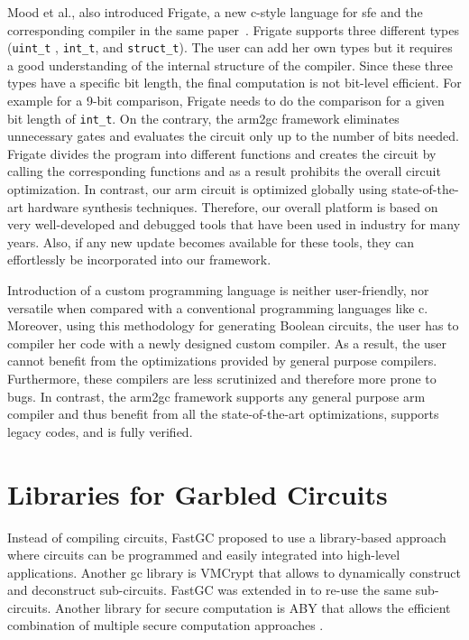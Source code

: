Mood et al., also introduced Frigate, a new \gls{c}-style language for \acrshort{sfe} and the corresponding compiler in the same paper~\cite{mood2016frigate}.
Frigate supports three different types (\texttt{uint\_t} , \texttt{int\_t}, and \texttt{struct\_t}).
The user can add her own types but it requires a good understanding of the internal structure of the compiler.
Since these three types have a specific bit length, the final computation is not bit-level efficient.
For example for a 9-bit comparison, Frigate needs to do the comparison for a given bit length of \texttt{int\_t}.
On the contrary, the \gls{arm2gc} framework eliminates unnecessary gates and evaluates the circuit only up to the number of bits needed.
Frigate divides the program into different functions and creates the circuit by calling the corresponding functions and as a result prohibits the overall circuit optimization.
In contrast, our \gls{arm} circuit is optimized globally using state-of-the-art hardware synthesis techniques.
Therefore, our overall platform is based on very well-developed and debugged tools that have been used in industry for many years.
Also, if any new update becomes available for these tools, they can effortlessly be incorporated into our framework.

Introduction of a custom programming language is neither user-friendly, nor versatile when compared with a conventional programming languages like \gls{c}.
Moreover, using this methodology for generating Boolean circuits, the user has to compiler her code with a newly designed custom compiler.
As a result, the user cannot benefit from the optimizations provided by general purpose compilers.
Furthermore, these compilers are less scrutinized and therefore more prone to bugs.
In contrast, the \gls{arm2gc} framework supports any general purpose \gls{arm} compiler and thus benefit from all the state-of-the-art optimizations, supports legacy codes, and is fully verified.


\section{Libraries for Garbled Circuits}\label{sec:related-library}
Instead of compiling circuits, FastGC \cite{huang2011faster} proposed to use a library-based approach where circuits can be programmed and easily integrated into high-level applications.
Another \acrshort{gc} library is VMCrypt \cite{malka2011vmcrypt} that allows to dynamically construct and deconstruct sub-circuits.
FastGC was extended in \cite{henecka2013faster} to re-use the same sub-circuits.
Another library for secure computation is ABY that allows the efficient combination of multiple secure computation approaches \cite{demmler2015aby}.


